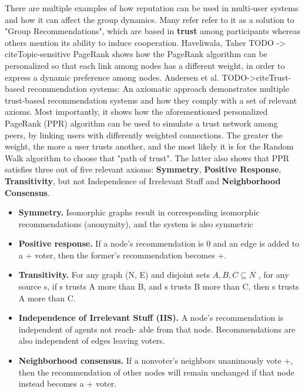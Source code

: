 There are multiple examples of how reputation can be used in multi-user systems and how it can affect the group dynamics. Many refer refer to it as a solution to "Group Recommendations", which are based in \textbf{trust} among participants whereas others mention its ability to induce cooperation. Haveliwala, Taher TODO -> cite{Topic-sensitive PageRank} shows how the PageRank algorithm can be personalized so that each link among nodes has a different weight, in order to express a dynamic preference among nodes. Andersen et al. TODO->cite{Trust-based recommendation systems: An axiomatic approach} demonstrates multiple trust-based recommendation systems and how they comply with a set of relevant axioms. Most importantly, it shows how the aforementioned personalized PageRank (PPR) algorithm can be used to simulate a trust network among peers, by linking users with differently weighted connections. The greater the weight, the more a user trusts another, and the most likely it is for the Random Walk algorithm to choose that "path of trust". The latter also shows that PPR satisfies three out of five relevant axioms: \textbf{Symmetry}, \textbf{Positive Response}, \textbf{Transitivity}, but not Independence of Irrelevant Stuff and \textbf{Neighborhood Consensus}.
\begin{itemize}
    \item \textbf{Symmetry.} Isomorphic graphs result in corresponding isomorphic recommendations (anonymity), and the system is also symmetric
    \item \textbf{Positive response.} If a node’s recommendation is 0 and an edge is added to a + voter, then the former’s recommendation becomes +.
    \item \textbf{Transitivity.} For any graph (N, E) and disjoint sets $ A, B, C \subseteq N $ , for any source s, if s trusts A more than B, and s trusts B more than C, then s trusts A more than C.
    \item \textbf{Independence of Irrelevant Stuﬀ (IIS).} A node’s recommendation is independent of agents not reach- able from that node. Recommendations are also independent of edges leaving voters.
    \item \textbf{Neighborhood consensus.} If a nonvoter’s neighbors unanimously vote +, then the recommendation of other nodes will remain unchanged if that node instead becomes a + voter.
\end{itemize}

